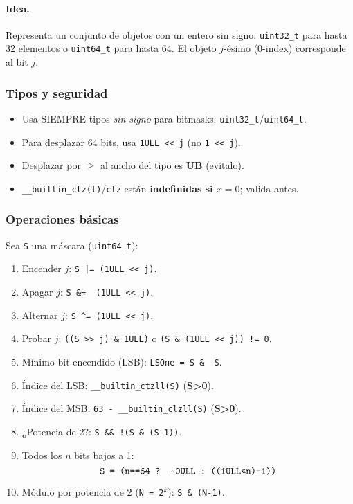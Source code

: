 \paragraph{Idea.} Representa un conjunto de objetos con un entero sin signo:
\texttt{uint32\_t} para hasta 32 elementos o \texttt{uint64\_t} para hasta 64.
El objeto $j$-ésimo (0-index) corresponde al bit $j$.

\subsubsection*{Tipos y seguridad}
\begin{itemize}
  \item Usa SIEMPRE tipos \emph{sin signo} para bitmasks: \texttt{uint32\_t}/\texttt{uint64\_t}.
  \item Para desplazar 64 bits, usa \texttt{1ULL << j} (no \texttt{1 << j}).
  \item Desplazar por $\ge$ al ancho del tipo es \textbf{UB} (evítalo).
  \item \texttt{\_\_builtin\_ctz(l)}/\texttt{clz} están \textbf{indefinidas si $x=0$}; valida antes.
\end{itemize}

\subsubsection*{Operaciones básicas}
Sea \texttt{S} una máscara (\texttt{uint64\_t}):
\begin{enumerate}
  \item Encender $j$: \texttt{S |= (1ULL << j)}.
  \item Apagar $j$: \texttt{S \&= \string~(1ULL << j)}.
  \item Alternar $j$: \texttt{S \string^= (1ULL << j)}.
  \item Probar $j$: \texttt{((S >> j) \& 1ULL)} o \texttt{(S \& (1ULL << j)) != 0}.
  \item Mínimo bit encendido (LSB): \texttt{LSOne = S \& -S}.
  \item Índice del LSB: \texttt{\_\_builtin\_ctzll(S)} (\textbf{S>0}).
  \item Índice del MSB: \texttt{63 - \_\_builtin\_clzll(S)} (\textbf{S>0}).
  \item ¿Potencia de 2?: \texttt{S \&\& !(S \& (S-1))}.
  \item Todos los $n$ bits bajos a 1:
  \[
    \texttt{S = (n==64 ? \string~0ULL : ((1ULL<<n)-1))}
  \]
  \item Módulo por potencia de 2 (\texttt{N = 2$^k$}): \texttt{S \& (N-1)}.
\end{enumerate}

